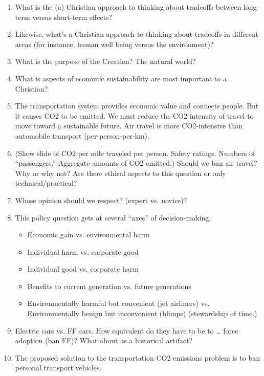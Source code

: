\documentclass[12pt]{article}
\begin{document}
\begin{enumerate}
  \item What is the (a) Christian approach to thinking about tradeoffs 
        between long-term versus short-term effects?
		
  \item Likewise, what's a Christian approach to thinking about tradeoffs in different areas
        (for instance, human well being versus the environment)?

  \item What is the purpose of the Creation? The natural world?

  \item What is aspects of economic sustainability are most important to a Christian?


\item The transportation system provides economic value and connects people. But it causes CO2 to be emitted. We must reduce the CO2 intensity of travel to move toward a sustainable future. Air travel is more CO2-intensive than automobile transport (per-person-per-km). 

\item (Show slide of CO2 per mile traveled per person. Safety ratings. Numbers of “passengers.” Aggregate amounts of CO2 emitted.) Should we ban air travel? Why or why not? Are there ethical aspects to this question or only technical/practical? 

\item Whose opinion should we respect? (expert vs. novice)?

\item This policy question gets at several “axes” of decision-making.
\begin{itemize}
\item Economic gain vs. environmental harm
\item Individual harm vs. corporate good
\item Individual good vs. corporate harm
\item Benefits to current generation vs. future generations
\item Environmentally harmful but convenient (jet airliners) vs. Environmentally benign but inconvenient (blimps) (stewardship of time.)
\end{itemize}


\item Electric cars vs. FF cars. How equivalent do they have to be to … force adoption (ban FF)? What about as a historical artifact?

\item The proposed solution to the transportation CO2 emissions problem is to ban personal transport vehicles.


\end{enumerate}
\end{document}
